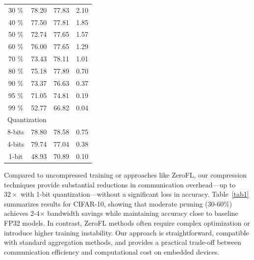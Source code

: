\documentclass[11pt]{report}
\begin{document}
\begin{table}[h]
{{\begin{tabular}{cccc}
        30 \%                                                                                         & 78.20 & 77.83 & 2.10 \\
        40 \%                                                                                         & 77.50 & 77.81 & 1.85 \\
        50 \%                                                                                         & 72.74 & 77.65 & 1.57 \\
        60 \%                                                                                         & 76.00 & 77.65 & 1.29 \\
        70 \%                                                                                         & 73.43 & 78.11 & 1.01 \\
        80 \%                                                                                         & 75.18 & 77.89 & 0.70 \\
        90 \%                                                                                         & 73.37 & 76.63 & 0.37 \\
        95 \%                                                                                         & 71.05 & 74.81 & 0.19 \\
        99 \%                                                                                         & 52.77 & 66.82 & 0.04 \\ \hline
        \multicolumn{4}{l}{Quantization}                                                                                     \\ \hline
        8-bits                                                                                        & 78.80 & 78.58 & 0.75 \\
        4-bits                                                                                        & 79.74 & 77.04 & 0.38 \\
        1-bit                                                                                         & 48.93 & 70.89 & 0.10 \\ \hline
      \end{tabular}
    }}
\end{table}

Compared to uncompressed training or approaches like ZeroFL, our compression techniques provide substantial reductions in communication overhead—up to $32\times$ with 1-bit quantization—without a significant loss in accuracy. Table~\ref{tab1} summarizes results for CIFAR-10, showing that moderate pruning (30-60\%) achieves 2-4$\times$ bandwidth savings while maintaining accuracy close to baseline FP32 models. In contrast, ZeroFL methods often require complex optimization or introduce higher training instability. Our approach is straightforward, compatible with standard aggregation methods, and provides a practical trade-off between communication efficiency and computational cost on embedded devices.
\end{document}
